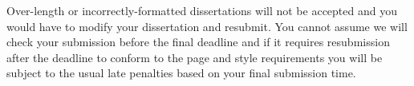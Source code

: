 \documentclass[logo,bsc,singlespacing,parskip]{infthesis}
\begin{document}
Over-length or incorrectly-formatted dissertations will not be accepted and you
would have to modify your dissertation and resubmit. You cannot assume we will
check your submission before the final deadline and if it requires resubmission
after the deadline to conform to the page and style requirements you will be
subject to the usual late penalties based on your final submission time.













\end{document}
